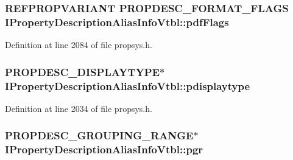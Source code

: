 \subsubsection[{\texorpdfstring{pdf\+Flags}{pdfFlags}}]{ {\bf R\+E\+F\+P\+R\+O\+P\+V\+A\+R\+I\+A\+NT} {\bf P\+R\+O\+P\+D\+E\+S\+C\+\_\+\+F\+O\+R\+M\+A\+T\+\_\+\+F\+L\+A\+GS} I\+Property\+Description\+Alias\+Info\+Vtbl\+::pdf\+Flags}\hypertarget{struct_i_property_description_alias_info_vtbl_a2c33ca1d06663dac60d5858cdcc7657d}{}\label{struct_i_property_description_alias_info_vtbl_a2c33ca1d06663dac60d5858cdcc7657d}


Definition at line 2084 of file propsys.\+h.

\subsubsection[{\texorpdfstring{pdisplaytype}{pdisplaytype}}]{ {\bf P\+R\+O\+P\+D\+E\+S\+C\+\_\+\+D\+I\+S\+P\+L\+A\+Y\+T\+Y\+PE}$\ast$ I\+Property\+Description\+Alias\+Info\+Vtbl\+::pdisplaytype}\hypertarget{struct_i_property_description_alias_info_vtbl_a2e0efc56b7219361453877fa721ef71c}{}\label{struct_i_property_description_alias_info_vtbl_a2e0efc56b7219361453877fa721ef71c}


Definition at line 2034 of file propsys.\+h.

\subsubsection[{\texorpdfstring{pgr}{pgr}}]{ {\bf P\+R\+O\+P\+D\+E\+S\+C\+\_\+\+G\+R\+O\+U\+P\+I\+N\+G\+\_\+\+R\+A\+N\+GE}$\ast$ I\+Property\+Description\+Alias\+Info\+Vtbl\+::pgr}\hypertarget{struct_i_property_description_alias_info_vtbl_a6f472f3938203f89f95a09d69ea2e2b1}{}\label{struct_i_property_description_alias_info_vtbl_a6f472f3938203f89f95a09d69ea2e2b1}


